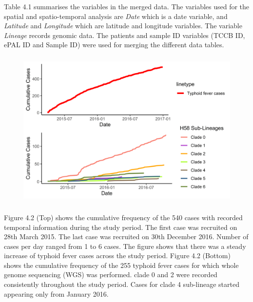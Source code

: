 \documentclass[12pt,a4paper]{report}
\begin{document}
Table 4.1 summarises the variables in the merged data. The variables used for the spatial and spatio-temporal analysis are \textit{Date} which is a date variable, and \textit{Latitude} and \textit{Longitude} which are latitude and longitude variables. The variable \textit{Lineage} records genomic data. The patients and sample ID variables (TCCB ID, ePAL ID and Sample ID) were used for merging the different data tables.\\

\begin{figure}[H]
\begin{center}
\includegraphics[width=\linewidth, height = 80mm]{Cumulative Cases Over Time (All Cases) and Cumulative Cases Over Time By Sub-Lineage.png}
\end{center}
\end{figure}

Figure 4.2 (Top) shows the cumulative frequency of the 540 cases with recorded temporal information during the study period. The first case was
recruited on 28th March 2015. The last case was recruited on 30th December 2016. Number of cases per day ranged from 1 to 6 cases. The figure shows that there was a steady increase of typhoid fever cases across the study period. Figure 4.2 (Bottom) shows the cumulative frequency of the 255 typhoid fever cases for which whole genome sequencing (WGS) was performed. clade 0 and 2 were recorded consistently throughout the
study period. Cases for clade 4 sub-lineage started appearing only from January 2016.\\
\end{document}
